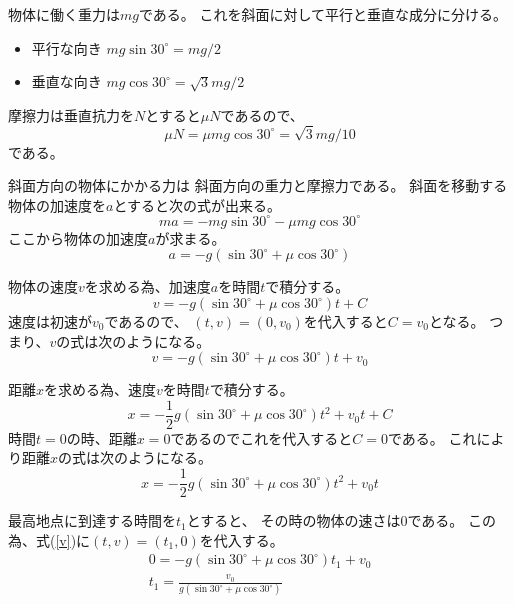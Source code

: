 \documentclass[12pt,b5paper]{ltjsarticle}
\begin{document}
物体に働く重力は$mg$である。
これを斜面に対して平行と垂直な成分に分ける。
\begin{itemize}
 \item 平行な向き $mg \sin 30^{\circ} = mg/2$
 \item 垂直な向き $mg \cos 30^{\circ} = \sqrt{3}mg/2$
\end{itemize}

摩擦力は垂直抗力を$N$とすると$\mu N$であるので、
\begin{equation}
 \mu N = \mu mg \cos 30^{\circ} = \sqrt{3}mg/10
\end{equation}
である。

斜面方向の物体にかかる力は
斜面方向の重力と摩擦力である。
斜面を移動する物体の加速度を$a$とすると次の式が出来る。
\begin{equation}
 ma = -mg \sin 30^{\circ} - \mu mg \cos 30^{\circ}
\end{equation}
ここから物体の加速度$a$が求まる。
\begin{equation}
 a = -g \left( \sin 30^{\circ} + \mu \cos 30^{\circ}\right)
\end{equation}

物体の速度$v$を求める為、加速度$a$を時間$t$で積分する。
\begin{equation}
 v = -g ( \sin 30^{\circ} + \mu \cos 30^{\circ} )t +C
\end{equation}
速度は初速が$v_0$であるので、
$(t,v)=(0,v_0)$を代入すると$C=v_0$となる。
つまり、$v$の式は次のようになる。
\begin{equation}
 v = -g ( \sin 30^{\circ} + \mu \cos 30^{\circ} )t + v_0
  \label{v}
\end{equation}


距離$x$を求める為、速度$v$を時間$t$で積分する。
\begin{equation}
 x = -\frac{1}{2}g ( \sin 30^{\circ} + \mu \cos 30^{\circ} )t^2 + v_0t + C
\end{equation}
時間$t=0$の時、距離$x=0$であるのでこれを代入すると$C=0$である。
これにより距離$x$の式は次のようになる。
\begin{equation}
 x = -\frac{1}{2}g ( \sin 30^{\circ} + \mu \cos 30^{\circ} )t^2 + v_0t
  \label{x}
\end{equation}

最高地点に到達する時間を$t_1$とすると、
その時の物体の速さは$0$である。
この為、式(\ref{v})に$(t,v)=(t_1,0)$を代入する。
\begin{align}
 0 = -g ( \sin 30^{\circ} + \mu \cos 30^{\circ} )t_1 + v_0\\
 t_1 = \frac{v_0}{g ( \sin 30^{\circ} + \mu \cos 30^{\circ} )}\label{at}
\end{align}
\end{document}
